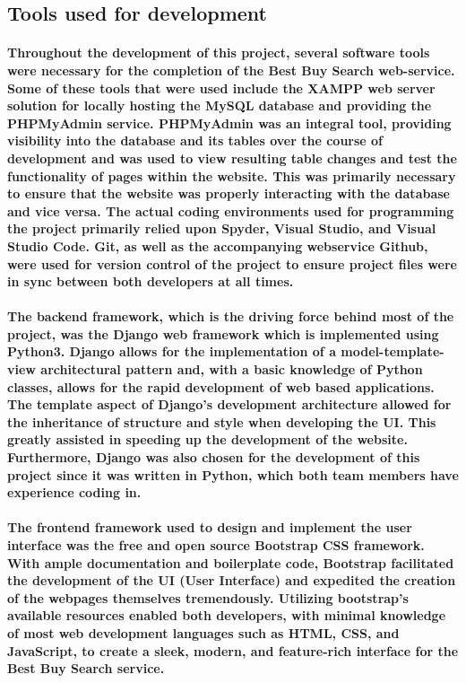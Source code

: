 \documentclass[sigconf]{acmart}
\begin{document}

\subsection{Tools used for development}

\paragraph{Throughout the development of this project, several software tools were necessary for the completion of the Best Buy Search web-service. Some of these tools that were used include the XAMPP web server solution for locally hosting the MySQL database and providing the PHPMyAdmin service. PHPMyAdmin was an integral tool, providing visibility into the database and its tables over the course of development and was used to view resulting table changes and test the functionality of pages within the website. This was primarily necessary to ensure that the website was properly interacting with the database and vice versa. The actual coding environments used for programming the project primarily relied upon Spyder, Visual Studio, and Visual Studio Code. Git, as well as the accompanying webservice Github, were used for version control of the project to ensure project files were in sync between both developers at all times.}

\paragraph{The backend framework, which is the driving force behind most of the project, was the Django web framework which is implemented using Python3. Django allows for the implementation of a model-template-view architectural pattern and, with a basic knowledge of Python classes, allows for the rapid development of web based applications. The template aspect of Django's development architecture allowed for the inheritance of structure and style when developing the UI. This greatly assisted in speeding up the development of the website. Furthermore, Django was also chosen for the development of this project since it was written in Python, which both team members have experience coding in.}

\paragraph{The frontend framework used to design and implement the user interface was the free and open source Bootstrap CSS framework. With ample documentation and boilerplate code, Bootstrap facilitated the development of the UI (User Interface) and expedited the creation of the webpages themselves tremendously. Utilizing bootstrap's available resources enabled both developers, with minimal knowledge of most web development languages such as HTML, CSS, and JavaScript, to create a sleek, modern, and feature-rich interface for the Best Buy Search service.}
  
\end{document}
